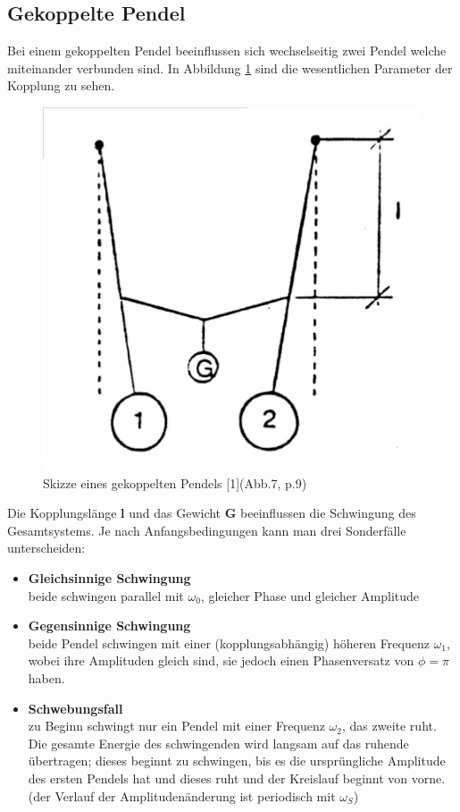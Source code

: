 \documentclass[12pt,a4paper]{article}
\begin{document}
\begin{multicols}{2}
\subsection{Gekoppelte Pendel}
Bei einem gekoppelten Pendel beeinflussen sich wechselseitig zwei Pendel welche miteinander verbunden sind. In Abbildung \ref{fig:gekoppelt_skizze} sind die wesentlichen Parameter der Kopplung zu sehen.

\begin{figure}[H]
	\centering
	\includegraphics[scale=0.45]{./figure/skizze_kopplung.png}
	\caption{Skizze eines gekoppelten Pendels [1](Abb.7, p.9)}
	\label{fig:gekoppelt_skizze}
\end{figure}
\noindent Die Kopplungslänge \textbf{l} und das Gewicht \textbf{G} beeinflussen die Schwingung des Gesamtsystems. Je nach Anfangsbedingungen kann man drei Sonderfälle unterscheiden:\\
\begin{itemize}
	\item  \textbf{Gleichsinnige Schwingung} \\ beide schwingen parallel mit $\omega_0$, gleicher Phase und gleicher Amplitude
	\item  \textbf{Gegensinnige Schwingung} \\ beide Pendel schwingen mit einer (kopplungsabhängig) höheren Frequenz $\omega_1$, wobei ihre Amplituden gleich sind, sie jedoch einen Phasenversatz von $\phi = \pi$ haben.
	\item  \textbf{Schwebungsfall} \\ zu Beginn schwingt nur ein Pendel mit einer Frequenz $\omega_2$, das zweite ruht. Die gesamte Energie des schwingenden wird langsam auf das ruhende übertragen; dieses beginnt zu schwingen, bis es die ursprüngliche Amplitude des ersten Pendels hat und dieses ruht und der Kreislauf beginnt von vorne.\\
	(der Verlauf der Amplitudenänderung ist periodisch mit $\omega_S$)
\end{itemize}


\end{multicols}
\end{document}

